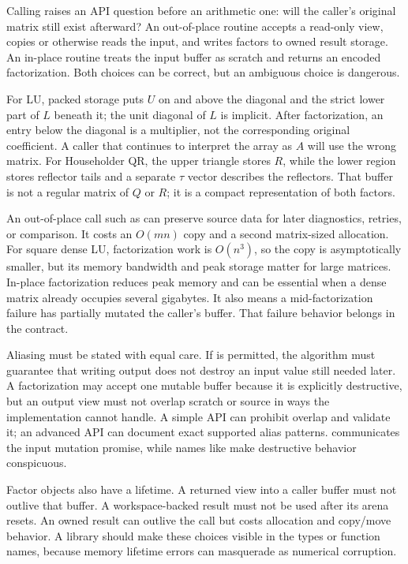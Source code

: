 Calling  raises an API question before an arithmetic one: will the caller's original matrix still exist afterward? An out-of-place routine accepts a read-only view, copies or otherwise reads the input, and writes factors to owned result storage. An in-place routine treats the input buffer as scratch and returns an encoded factorization. Both choices can be correct, but an ambiguous choice is dangerous.

For LU, packed storage puts \(U\) on and above the diagonal and the strict lower part of \(L\) beneath it; the unit diagonal of \(L\) is implicit. After factorization, an entry below the diagonal is a multiplier, not the corresponding original coefficient. A caller that continues to interpret the array as \(A\) will use the wrong matrix. For Householder QR, the upper triangle stores \(R\), while the lower region stores reflector tails and a separate \(\tau\) vector describes the reflectors. That buffer is not a regular matrix of \(Q\) or \(R\); it is a compact representation of both factors.

An out-of-place call such as  can preserve source data for later diagnostics, retries, or comparison. It costs an \(O(mn)\) copy and a second matrix-sized allocation. For square dense LU, factorization work is \(O(n^3)\), so the copy is asymptotically smaller, but its memory bandwidth and peak storage matter for large matrices. In-place factorization reduces peak memory and can be essential when a dense matrix already occupies several gigabytes. It also means a mid-factorization failure has partially mutated the caller's buffer. That failure behavior belongs in the contract.

Aliasing must be stated with equal care. If  is permitted, the algorithm must guarantee that writing output does not destroy an input value still needed later. A factorization may accept one mutable buffer because it is explicitly destructive, but an output view must not overlap scratch or source in ways the implementation cannot handle. A simple API can prohibit overlap and validate it; an advanced API can document exact supported alias patterns.  communicates the input mutation promise, while names like  make destructive behavior conspicuous.

Factor objects also have a lifetime. A returned view into a caller buffer must not outlive that buffer. A workspace-backed result must not be used after its arena resets. An owned result can outlive the call but costs allocation and copy/move behavior. A library should make these choices visible in the types or function names, because memory lifetime errors can masquerade as numerical corruption.

